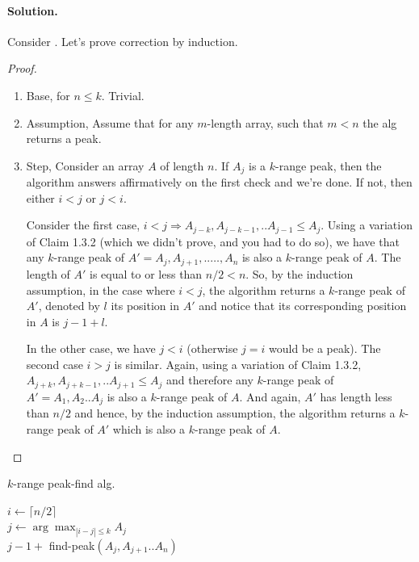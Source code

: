   \paragraph{Solution.} Consider . 
Let's prove correction by induction.
\begin{proof}
\begin{enumerate}
  \item Base, for $n \le k$. Trivial. 
  \item Assumption, Assume that for any $m$-length array, such that $m<n$ the alg returns a peak. 
  \item Step, Consider an array $A$ of length $n$. If $A_j$ is a $k$-range peak, then the algorithm answers affirmatively on the first check and we're done. If not, then either $i < j$ or $j < i$. 

    Consider the first case, $i < j \Rightarrow A_{j-k}, A_{j-k-1},..A_{j-1} \le A_j$. Using a variation of Claim 1.3.2 (which we didn't prove, and you had to do so), we have that any $k$-range peak of $A' = A_j, A_{j + 1},.. \dots, A_n$ is also a $k$-range peak of $A$. The length of $A'$ is equal to or less than $n/2 < n$. So, by the induction assumption, in the case where $i < j$, the algorithm returns a $k$-range peak of $A'$, denoted by $l$ its position in $A'$ and notice that its corresponding position in $A$ is $j-1+l$.

    In the other case, we have $j < i$ (otherwise $j = i$ would be a peak). The second case $i > j$ is similar. Again, using a variation of Claim 1.3.2, $A_{j+k},A_{j+k-1},..A_{j+1} \le A_j$ and therefore any $k$-range peak of $A' = A_1,A_2..A_j$ is also a $k$-range peak of $A$. And again, $A'$ has length less than $n/2$ and hence, by the induction assumption, the algorithm returns a $k$-range peak of $A'$ which is also a $k$-range peak of $A$.
\end{enumerate}
\end{proof}

\begin{algorithm}
\caption{$k$-range peak-find alg.} \label{alg:krange}
        $i \leftarrow  \lceil n/2 \rceil $\\
        $j \leftarrow \arg \max_{|i-j|\le k}{ A_{j} }$ \\
         { 
          \Return $j -1 + $ find-peak$\left(A_{j},A_{j+1}..A_{n}\right)$
        }
\end{algorithm}

